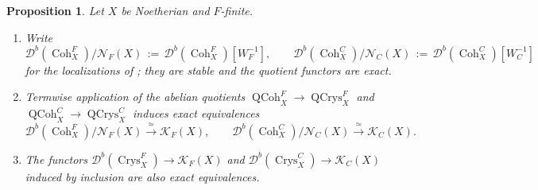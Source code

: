 \documentclass[11pt]{amsart}
\newcommand{\cN}{\mathcal{N}}
\newcommand{\QCoh}{\operatorname{{QCoh}}}
\newcommand{\Coh}{\operatorname{{Coh}}}
\newcommand{\Crys}{\operatorname{Crys}}
\newcommand{\QCrys}{\operatorname{QCrys}}
\newcommand{\Db}{\mathcal D^b}
\newcommand{\KF}{\mathcal K_F}
\newcommand{\KC}{\mathcal K_C}
\theoremstyle{plain}
\newtheorem{proposition}[proposition]{Proposition}
\theoremstyle{definition}
\numberwithin{equation}{section}
\begin{document}
\begin{proposition}\label{prop:quotient-comparison}
Let $X$ be Noetherian and $F$-finite.
\begin{enumerate}
\item
Write
\[
 \Db(\Coh^F_X)/\cN_F(X)\,:=\,\Db(\Coh^F_X)[W_F^{-1}],\qquad
 \Db(\Coh^C_X)/\cN_C(X)\,:=\,\Db(\Coh^C_X)[W_C^{-1}]
\]
for the localizations of \cite[Theorem I.3.3(i)]{NS}; they are stable and the quotient functors are exact.
\item
Termwise application of the abelian quotients $\QCoh^F_X\to\QCrys^F_X$ and $\QCoh^C_X\to\QCrys^C_X$ induces exact equivalences
\begin{equation}\label{eq:crystal-quotient}
 \Db(\Coh^F_X)/\cN_F(X)
 \xrightarrow{\ \simeq\ }\KF(X),\qquad
 \Db(\Coh^C_X)/\cN_C(X)
 \xrightarrow{\ \simeq\ }\KC(X).
\end{equation}
\item
The functors $\Db(\Crys^F_X)\to\KF(X)$ and $\Db(\Crys^C_X)\to\KC(X)$ induced by inclusion are also exact equivalences.
\end{enumerate}
\end{proposition}
\end{document}

